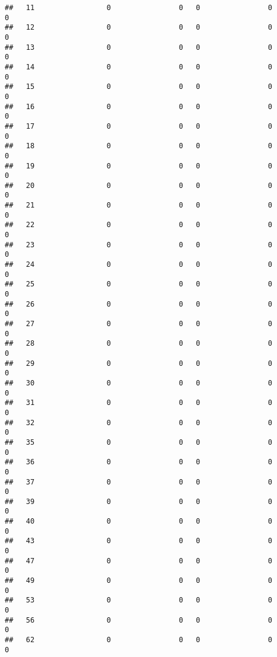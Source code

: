 \documentclass[]{article}
\begin{document}
\begin{verbatim}
##   11                 0                0   0                0                0
##   12                 0                0   0                0                0
##   13                 0                0   0                0                0
##   14                 0                0   0                0                0
##   15                 0                0   0                0                0
##   16                 0                0   0                0                0
##   17                 0                0   0                0                0
##   18                 0                0   0                0                0
##   19                 0                0   0                0                0
##   20                 0                0   0                0                0
##   21                 0                0   0                0                0
##   22                 0                0   0                0                0
##   23                 0                0   0                0                0
##   24                 0                0   0                0                0
##   25                 0                0   0                0                0
##   26                 0                0   0                0                0
##   27                 0                0   0                0                0
##   28                 0                0   0                0                0
##   29                 0                0   0                0                0
##   30                 0                0   0                0                0
##   31                 0                0   0                0                0
##   32                 0                0   0                0                0
##   35                 0                0   0                0                0
##   36                 0                0   0                0                0
##   37                 0                0   0                0                0
##   39                 0                0   0                0                0
##   40                 0                0   0                0                0
##   43                 0                0   0                0                0
##   47                 0                0   0                0                0
##   49                 0                0   0                0                0
##   53                 0                0   0                0                0
##   56                 0                0   0                0                0
##   62                 0                0   0                0                0

\end{verbatim}
\end{document}
